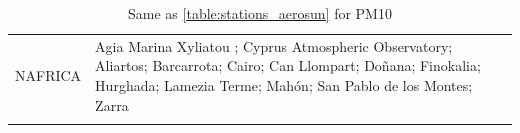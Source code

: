 \documentclass[journal abbreviation, manuscript]{copernicus}
\begin{document}
\begin{table}
\begin{tabularx}{\textwidth}{lX}
  NAFRICA  & Agia Marina Xyliatou ; Cyprus Atmospheric Observatory; Aliartos; Barcarrota; Cairo; Can Llompart; Doñana; Finokalia; Hurghada; Lamezia Terme; Mahón; San Pablo de los Montes; Zarra                                                                                                                                                                                                                                                                                                                                                                                                                                                                                                                                                                                                                                                                                                                                                                                                                                                                                                                                                                                                                                                                                                                                                                                                                                                                                                                                                                                                                                                                                                                                                                                                                                                                                                                                                                                                                             \\
  \bottomhline
 \end{tabularx}
 \caption{Same as \ref{table:stations_aerosun} for PM10}
 \label{table:stations_pm10}
\end{table}

\clearpage
\end{document}
